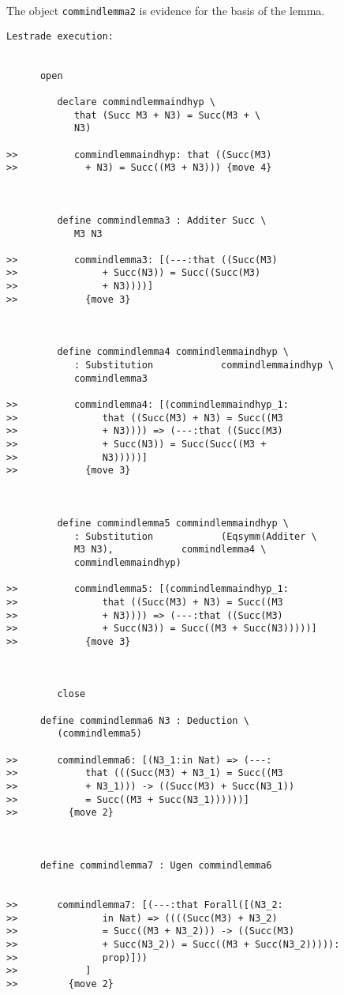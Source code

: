 \documentclass[12pt]{article}
\begin{document}
The object {\tt commindlemma2} is evidence for the basis of the lemma.

\begin{verbatim}Lestrade execution:


      open

         declare commindlemmaindhyp \
            that (Succ M3 + N3) = Succ(M3 + \
            N3)

>>          commindlemmaindhyp: that ((Succ(M3)
>>            + N3) = Succ((M3 + N3))) {move 4}



         define commindlemma3 : Additer Succ \
            M3 N3

>>          commindlemma3: [(---:that ((Succ(M3)
>>               + Succ(N3)) = Succ((Succ(M3)
>>               + N3))))]
>>            {move 3}



         define commindlemma4 commindlemmaindhyp \
            : Substitution            commindlemmaindhyp \
            commindlemma3

>>          commindlemma4: [(commindlemmaindhyp_1:
>>               that ((Succ(M3) + N3) = Succ((M3
>>               + N3)))) => (---:that ((Succ(M3)
>>               + Succ(N3)) = Succ(Succ((M3 +
>>               N3)))))]
>>            {move 3}



         define commindlemma5 commindlemmaindhyp \
            : Substitution            (Eqsymm(Additer \
            M3 N3),            commindlemma4 \
            commindlemmaindhyp)

>>          commindlemma5: [(commindlemmaindhyp_1:
>>               that ((Succ(M3) + N3) = Succ((M3
>>               + N3)))) => (---:that ((Succ(M3)
>>               + Succ(N3)) = Succ((M3 + Succ(N3)))))]
>>            {move 3}



         close

      define commindlemma6 N3 : Deduction \
         (commindlemma5)

>>       commindlemma6: [(N3_1:in Nat) => (---:
>>            that (((Succ(M3) + N3_1) = Succ((M3
>>            + N3_1))) -> ((Succ(M3) + Succ(N3_1))
>>            = Succ((M3 + Succ(N3_1))))))]
>>         {move 2}



      define commindlemma7 : Ugen commindlemma6


>>       commindlemma7: [(---:that Forall([(N3_2:
>>               in Nat) => ((((Succ(M3) + N3_2)
>>               = Succ((M3 + N3_2))) -> ((Succ(M3)
>>               + Succ(N3_2)) = Succ((M3 + Succ(N3_2))))):
>>               prop)]))
>>            ]
>>         {move 2}




\end{verbatim}
\end{document}
